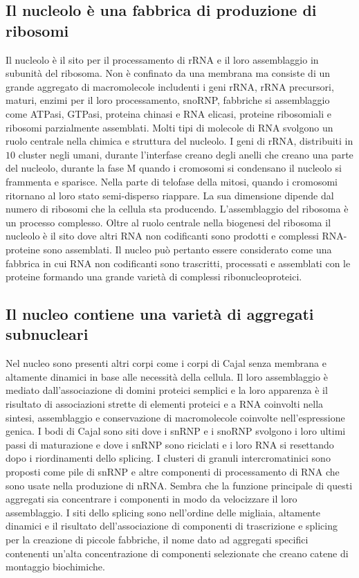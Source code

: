 \subsection{Il nucleolo \`e una fabbrica di produzione di ribosomi}
Il nucleolo \`e il sito per il processamento di rRNA e il loro assemblaggio in subunit\`a del ribosoma. Non \`e confinato da una membrana ma consiste di un grande aggregato di 
macromolecole includenti i geni rRNA, rRNA precursori, maturi, enzimi per il loro processamento, snoRNP, fabbriche si assemblaggio come ATPasi, GTPasi, proteina chinasi e RNA elicasi, 
proteine ribosomiali e ribosomi parzialmente assemblati. Molti tipi di molecole di RNA svolgono un ruolo centrale nella chimica e struttura del nucleolo. I geni di rRNA, distribuiti in
$10$ cluster negli umani, durante l'interfase creano degli anelli che creano una parte del nucleolo, durante la fase M quando i cromosomi si condensano il nucleolo si frammenta e 
sparisce. Nella parte di telofase della mitosi, quando i cromosomi ritornano al loro stato semi-disperso riappare. La sua dimensione dipende dal numero di ribosomi che la cellula sta
producendo. L'assemblaggio del ribosoma \`e un processo complesso. Oltre al ruolo centrale nella biogenesi del ribosoma il nucleolo \`e il sito dove altri RNA non codificanti sono
prodotti e complessi RNA-proteine sono assemblati. Il nucleo pu\`o pertanto essere considerato come una fabbrica in cui RNA non codificanti sono trascritti, processati e assemblati con
le proteine formando una grande variet\`a di complessi ribonucleoproteici. 
\subsection{Il nucleo contiene una variet\`a di aggregati subnucleari}
Nel nucleo sono presenti altri corpi come i corpi di Cajal senza membrana e altamente dinamici in base alle necessit\`a della cellula. Il loro assemblaggio \`e mediato dall'associazione
di domini proteici semplici e la loro apparenza \`e il risultato di associazioni strette di elementi proteici e a RNA coinvolti nella sintesi, assemblaggio e conservazione di 
macromolecole coinvolte nell'espressione genica. I bodi di Cajal sono siti dove i snRNP e i snoRNP svolgono i loro ultimi passi di maturazione e dove i snRNP sono riciclati e i loro RNA
si resettando dopo i riordinamenti dello splicing. I clusteri di granuli intercromatinici sono proposti come pile di snRNP e altre componenti di processamento di RNA che sono 
usate nella produzione di nRNA. Sembra che la funzione principale di questi aggregati sia concentrare i componenti in modo da velocizzare il loro assemblaggio. I siti dello splicing
sono nell'ordine delle migliaia, altamente dinamici e il risultato dell'associazione di componenti di trascrizione e splicing per la creazione di piccole fabbriche, il nome dato ad
aggregati specifici contenenti un'alta concentrazione di componenti selezionate che creano catene di montaggio biochimiche. 
